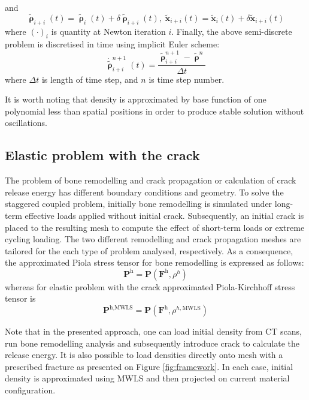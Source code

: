 \documentclass[11pt]{acmeArticle}
\numberwithin{equation}{section}
\begin{document}
and 
\begin{equation}
\tilde{\pmb\uprho}_{i+i}(t) =
\tilde{\pmb\uprho}_{i}(t) + \delta\tilde{\pmb\uprho}_{i+i}(t),\;
	\tilde{\mathbf{x}}_{i+i}(t) =
	\tilde{\mathbf{x}}_{i}(t) + \delta\tilde{\mathbf{x}}_{i+i}(t)
\end{equation}
where $(\cdot)_i$ is quantity at Newton iteration $i$. Finally, the
above semi-discrete problem is discretised in time using implicit Euler scheme:
\begin{equation}
	\dot{\tilde{\pmb\uprho}}_{i+i}^{n+1}(t) =
	\frac{
	\tilde{\pmb\uprho}_{i+i}^{n+1}-\tilde{\pmb\uprho}^{n}
	}{\Delta t}
\end{equation}
where $\Delta t$ is length of time step, and $n$ is time step number.

It is worth noting that density is approximated by base  function of one polynomial less than spatial positions in
order to produce stable solution without oscillations.

\subsection{Elastic problem with the crack}

The problem of bone remodelling and crack propagation or calculation of crack
release energy has different boundary conditions and geometry. 
To solve the staggered coupled problem, initially bone remodelling is simulated under 
long-term effective loads applied without initial crack. Subsequently, an 
initial crack is placed to the resulting mesh to compute the effect 
of short-term loads or extreme cycling loading. The two different remodelling and crack propagation 
meshes are tailored for the each type of problem analysed, respectively. As
a consequence, the approximated Piola stress tensor for bone
remodelling is expressed as follows:
\begin{equation}
	\mathbf{P}^\textrm{h} = 
		\mathbf{P}(\mathbf{F}^\textrm{h}, \rho^h)
\end{equation}
whereas for elastic problem with the crack approximated Piola-Kirchhoff stress tensor is
\begin{equation}
	\mathbf{P}^{\textrm{h},\textrm{MWLS}} = 
		\mathbf{P}(
		\mathbf{F}^\textrm{h}, \rho^{h,\textrm{MWLS}})
\end{equation}

Note that in the presented approach, one can load initial density from CT
scans, run bone remodelling analysis and subsequently introduce crack to calculate the 
release energy. It is also possible to load densities directly onto mesh with a prescribed fracture as presented on Figure \ref{fig:framework}.
In each case, initial density is approximated using MWLS and then projected on current 
material configuration.
\end{document}
